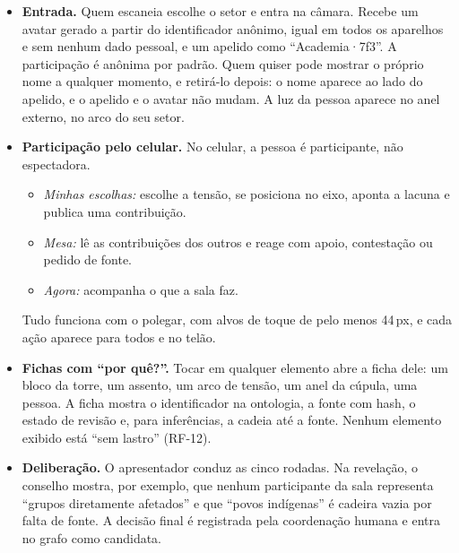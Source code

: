 \documentclass[12pt,a4paper,oneside,english,brazil]{abntex2}
\newcommand{\rf}[1]{{\footnotesize(#1)}}
\begin{document}
\begin{itemize}[leftmargin=*]
  \item \textbf{Entrada.} Quem escaneia escolhe o setor e entra na câmara. Recebe um avatar gerado a partir do identificador anônimo, igual em todos os aparelhos e sem nenhum dado pessoal, e um apelido como ``Academia·7f3''. A participação é anônima por padrão. Quem quiser pode mostrar o próprio nome a qualquer momento, e retirá-lo depois: o nome aparece ao lado do apelido, e o apelido e o avatar não mudam. A luz da pessoa aparece no anel externo, no arco do seu setor.
  \item \textbf{Participação pelo celular.} No celular, a pessoa é participante, não espectadora.
    \begin{itemize}
      \item \emph{Minhas escolhas:} escolhe a tensão, se posiciona no eixo, aponta a lacuna e publica uma contribuição.
      \item \emph{Mesa:} lê as contribuições dos outros e reage com apoio, contestação ou pedido de fonte.
      \item \emph{Agora:} acompanha o que a sala faz.
    \end{itemize}
    Tudo funciona com o polegar, com alvos de toque de pelo menos 44\,px, e cada ação aparece para todos e no telão.
  \item \textbf{Fichas com ``por quê?''.} Tocar em qualquer elemento abre a ficha dele: um bloco da torre, um assento, um arco de tensão, um anel da cúpula, uma pessoa. A ficha mostra o identificador na ontologia, a fonte com hash, o estado de revisão e, para inferências, a cadeia até a fonte. Nenhum elemento exibido está ``sem lastro'' \rf{RF-12}.
  \item \textbf{Deliberação.} O apresentador conduz as cinco rodadas. Na revelação, o conselho mostra, por exemplo, que nenhum participante da sala representa ``grupos diretamente afetados'' e que ``povos indígenas'' é cadeira vazia por falta de fonte. A decisão final é registrada pela coordenação humana e entra no grafo como candidata.
\end{itemize}
\end{document}
